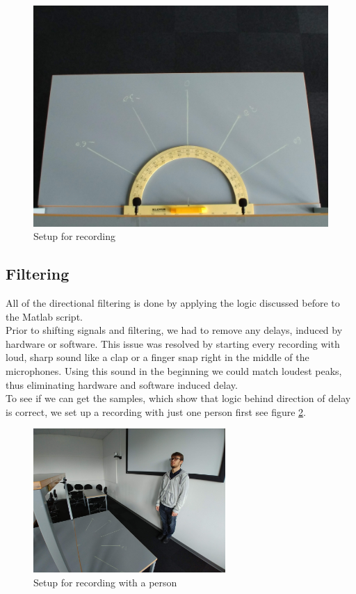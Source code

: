 \begin{figure}[htp]
	\centering
	\includegraphics[width=1\textwidth]{Illustrations/JustSetup.jpg}
	\caption{Setup for recording}
	\label{fig:recSetup}
\end{figure}
\subsection{Filtering}
All of the directional filtering is done by applying the logic discussed before to the Matlab script.\\
Prior to shifting signals and filtering, we had to remove any delays, induced by hardware or software. This 
issue was resolved by starting every recording with loud, sharp sound like a clap or a finger snap right in 
the middle of the microphones. Using this sound in the beginning we could match loudest peaks, thus 
eliminating hardware and software induced delay. \\
To see if we can get the samples, which show that logic behind direction of delay is correct, we set up a 
recording with just one person first see figure \ref{fig:RanzvanRecSetup}.\\

\begin{figure}[htp]
	\centering
	\includegraphics[width=0.65\textwidth]{Illustrations/razvanWithSetup.jpg}
	\caption{Setup for recording with a person}
	\label{fig:RanzvanRecSetup}
\end{figure}
\newpage

